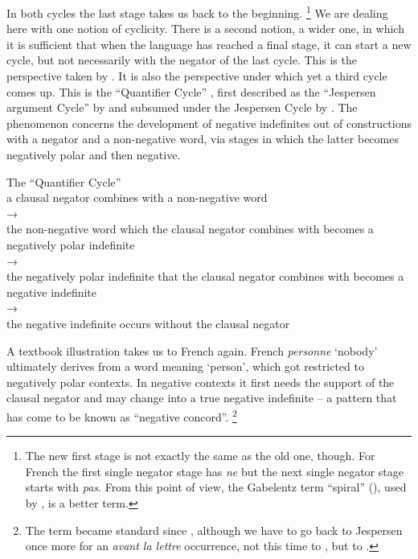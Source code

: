 ﻿\documentclass[output=paper,draft,draftmode,colorlinks,citecolor=brown]{langscibook}
\begin{document}
In both cycles the last stage takes us back to the beginning.%
%
\footnote{The new first stage is not exactly the same as the old one,
though. For French the first single negator stage has \textit{ne} but the
next single negator stage starts with \textit{pas}. From this point of
view, the Gabelentz term ``spiral'' (\citeyear[251]{Gabelentz1891}), used by
\textcite[394]{Meillet1912}, is a better term.} %
%
We are dealing here with one notion of cyclicity. There is a second notion,
a wider one, in which it is sufficient that when the language has reached a
final stage, it can start a new cycle, but not necessarily with the negator
of the last cycle. This is the perspective taken by 
\textcite{Gelderen2011}. It is also the perspective under which yet a third
cycle comes up. This is the ``Quantifier Cycle''
\parencite[e.g.][36]{WillisLucas2013}, first described as the ``Jespersen argument Cycle'' by
\textcite[438]{Ladusaw1993} and subsumed under the Jespersen Cycle by
\textcite{Larrivee2011}. The phenomenon concerns the development of negative
indefinites out of constructions with a negator and a non-negative word,
via stages in which the latter becomes negatively polar and then negative. 
%
\begin{exe}\ex\label{ex:int-qc}
    The ``Quantifier Cycle''\\[1ex]
a clausal negator combines with a non-negative word\\ 
→\\ 
the non-negative word which the clausal negator combines with becomes a
negatively polar indefinite \\
→\\
the negatively polar indefinite that the clausal negator combines with
becomes a negative indefinite\\ 
→\\
the negative indefinite occurs without the clausal negator
\end{exe}
%
A textbook illustration takes us to French again. French \textit{personne}
`nobody' ultimately derives from a word meaning `person', which got
restricted to negatively polar contexts. In negative contexts it first
needs the support of the clausal negator and may change into a true
negative indefinite -- a pattern that has come to be known as ``negative
concord''.%
%
\footnote{The term became standard since \textcite{Giannakidou1998},
although we have to go back to Jespersen once more for an \textit{avant
la lettre} occurrence, not this time to
\textcite{Jespersen1917}, but to \textcite[352]{Jespersen1922}.} %
\end{document}
